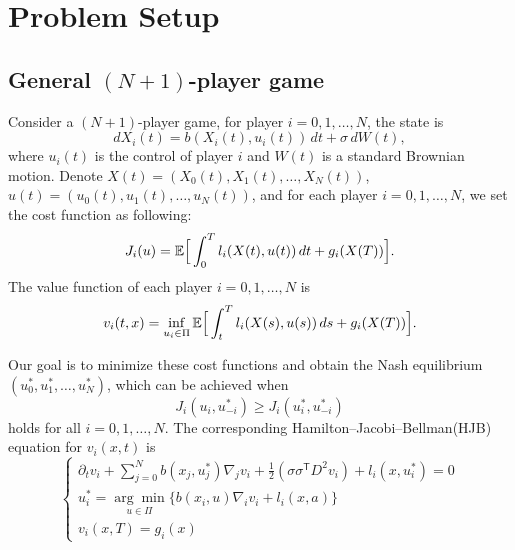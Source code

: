 \documentclass{article}
\begin{document}
 
\section{Problem Setup}

\subsection{General $(N+1)$-player game}

Consider a $(N+1)$-player game, for player $i = 0, 1, \dots, N$, the state is
\begin{equation} \label{state of N+1 player game}
    d X_{i}(t) = b(X_{i}(t), u_{i}(t)) \, d t + \sigma \, d W(t),
\end{equation}
where $u_{i} (t)$ is the control of player $i$ and $W(t)$ is a standard Brownian motion. Denote $X(t) = (X_{0}(t), X_{1}(t), \dots, X_{N}(t))$,  $u(t) = (u_{0}(t), u_{1}(t), \dots, u_{N}(t))$, and for each player $i = 0, 1, \dots, N$, we set the cost function as following:
\begin{equation} \label{cost function of of N+1 player game}
    J_{i}(u) = \mathbb{E} \Big{[} \int_{0}^{T} l_{i}(X(t), u(t)) \, d t + g_{i}(X(T)) \Big{]}.
\end{equation}
The value function of each player $i = 0, 1, \dots, N$ is
\begin{equation*} \label{value function of N+1 player game}
    v_{i} (t,x) = \inf_{u_{i} \in \Pi} \mathbb{E} \Big{[} \int_{t}^{T} l_{i}(X(s), u(s)) \, d s + g_{i}(X(T)) \Big{]}.
\end{equation*}

Our goal is to minimize these cost functions and obtain the Nash equilibrium $(u_{0}^{*}, u_{1}^{*}, \dots, u_{N}^{*})$, which can be achieved when 
\begin{equation} \label{eq: Nash equilibrium of N+1 player game}
    J_{i}(u_{i}, u_{-i}^{*}) \geq J_{i}(u_{i}^{*}, u_{-i}^{*})
\end{equation}
holds for all $i = 0, 1, \dots, N$. The corresponding Hamilton–Jacobi–Bellman(HJB) equation for $v_{i}(x, t)$ is
\begin{equation} \label{HJB of N+1 player game}
    \begin{cases}
    \partial_{t} v_{i} + \sum_{j = 0}^{N} b(x_{j}, u_{j}^{*}) \nabla_{j} v_{i} + \frac{1}{2} (\sigma \sigma^\mathsf{T} D^{2} v_{i}) + l_{i}(x, u_{i}^{*}) = 0 \\
    u_{i}^{*} = \underset{u \in \Pi}{\arg\min} \{b(x_{i}, u) \nabla_{i} v_{i} + l_{i}(x, a) \} \\
    v_{i} (x, T) = g_{i} (x)
    \end{cases}
\end{equation}
\end{document}
